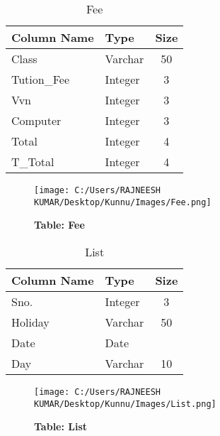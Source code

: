 
\begin{table}[h!]
	\begin{center}
		\caption{Fee}
			\begin{tabular}{| l | l | c |}
				\hline
				Column Name & Type & Size \\
				\hline
				Class & Varchar & 50 \\
				Tution\_Fee & Integer & 3 \\
				Vvn & 	Integer & 3 \\
				Computer & Integer	& 3 \\
				Total & Integer & 4 \\
				T\_Total & Integer & 4 \\
				\hline
			\end{tabular}
		\end{center}
	\end{table}

\begin{figure}[H]
  \centering
    \texttt{[image: C:/Users/RAJNEESH KUMAR/Desktop/Kunnu/Images/Fee.png]}
    \caption{\textbf{Table: Fee}}
\end{figure}
			

\begin{table}[h!]
	\begin{center}
		\caption{List}
			\begin{tabular}{| l | l | c |}
				\hline
				Column Name & Type & Size \\
				\hline
				Sno. & Integer & 3 \\
				Holiday & Varchar & 50 \\
				Date & Date & \\
				Day &	Varchar & 10 \\
				\hline
			\end{tabular}
		\end{center}
	\end{table}

\begin{figure}[H]
  \centering
    \texttt{[image: C:/Users/RAJNEESH KUMAR/Desktop/Kunnu/Images/List.png]}
    \caption{\textbf{Table: List}}
\end{figure}
			

